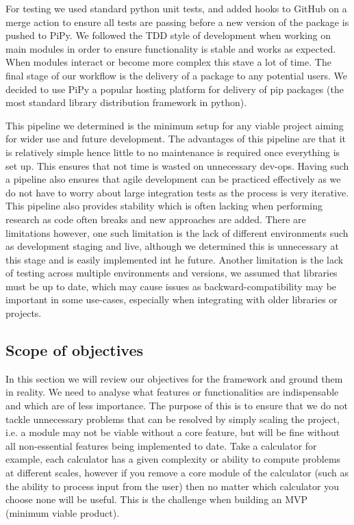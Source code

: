 For testing we used standard python unit tests, and added hooks to GitHub on a merge action to ensure all tests are passing before a new version of the package is pushed to PiPy. We followed the TDD style of development when working on main modules in order to ensure functionality is stable and works as expected. When modules interact or become more complex this stave a lot of time. The final stage of our workflow is the delivery of a package to any potential users. We decided to use PiPy a popular hosting platform for delivery of pip packages (the most standard library distribution framework in python).

This pipeline we determined is the minimum setup for any viable project aiming for wider use and future development. The advantages of this pipeline are that it is relatively simple hence little to no maintenance is required once everything is set up. This ensures that not time is wasted on unnecessary dev-ops. Having such a pipeline also ensures that agile development can be practiced effectively as we do not have to worry about large integration tests as the process is very iterative. This pipeline also provides stability which is often lacking when performing research as code often breaks and new approaches are added. There are limitations however, one such limitation is the lack of different environments such as development staging and live, although we determined this is unnecessary at this stage and is easily implemented int he future. Another limitation is the lack of testing across multiple environments and versions, we assumed that libraries must be up to date, which may cause issues as backward-compatibility may be important in some use-cases, especially when integrating with older libraries or projects.
\newpage

\subsection{Scope of objectives}
In this section we will review our objectives for the framework and ground them in reality. We need to analyse what features or functionalities are indispensable and which are of less importance. The purpose of this is to ensure that we do not tackle unnecessary problems that can be resolved by simply scaling the project, i.e. a module may not be viable without a core feature, but will be fine without all non-essential features being implemented to date. Take a calculator for example, each calculator has a given complexity or ability to compute problems at different scales, however if you remove a core module of the calculator (such as the ability to process input from the user) then no matter which calculator you choose none will be useful. This is the challenge when building an MVP (minimum viable product).

